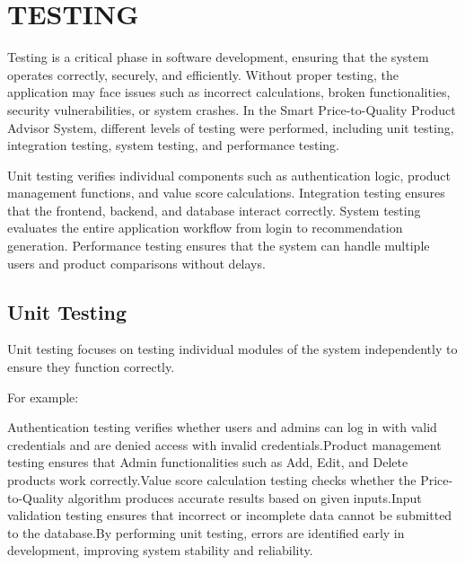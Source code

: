 \chapter{TESTING}
\sloppy
Testing is a critical phase in software development, ensuring that the system operates correctly, securely, and efficiently. Without proper testing, the application may face issues such as incorrect calculations, broken functionalities, security vulnerabilities, or system crashes. In the Smart Price-to-Quality Product Advisor System, different levels of testing were performed, including unit testing, integration testing, system testing, and performance testing.

Unit testing verifies individual components such as authentication logic, product management functions, and value score calculations. Integration testing ensures that the frontend, backend, and database interact correctly. System testing evaluates the entire application workflow from login to recommendation generation. Performance testing ensures that the system can handle multiple users and product comparisons without delays. 
\noindent

\section{Unit Testing}
Unit testing focuses on testing individual modules of the system independently to ensure they function correctly.

For example:

Authentication testing verifies whether users and admins can log in with valid credentials and are denied access with invalid credentials.Product management testing ensures that Admin functionalities such as Add, Edit, and Delete products work correctly.Value score calculation testing checks whether the Price-to-Quality algorithm produces accurate results based on given inputs.Input validation testing ensures that incorrect or incomplete data cannot be submitted to the database.By performing unit testing, errors are identified early in development, improving system stability and reliability.



